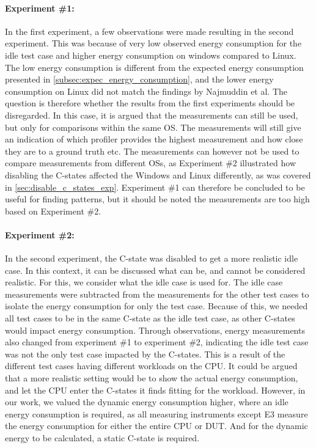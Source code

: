 \paragraph*{Experiment \#1:} In the first experiment, a few observations were made resulting in the second experiment. This was because of very low observed energy consumption for the idle test case and higher energy consumption on windows compared to Linux. The low energy consumption is different from the expected energy consumption presented in \cref{subsec:expec_energy_consumption}, and the lower energy consumption on Linux did not match the findings by Najmuddin et al.\cite[]{Najmuddin2021} The question is therefore whether the results from the first experiments should be disregarded. In this case, it is argued that the measurements can still be used, but only for comparisons within the same OS. The measurements will still give an indication of which profiler provides the highest measurement and how close they are to a ground truth etc. The measurements can however not be used to compare measurements from different OSs, as Experiment \#2 illustrated how disabling the C-states affected the Windows and Linux differently, as was covered in \cref{sec:disable_c_states_exp}. Experiment \#1 can therefore be concluded to be useful for finding patterns, but it should be noted the measurements are too high based on Experiment \#2.

\paragraph*{Experiment \#2:} In the second experiment, the C-state was disabled to get a more realistic idle case. In this context, it can be discussed what can be, and cannot be considered realistic. For this, we consider what the idle case is used for. The idle case measurements were subtracted from the measurements for the other test cases to isolate the energy consumption for only the test case. Because of this, we needed all test cases to be in the same C-state as the idle test case, as other C-states would impact energy consumption. Through observations, energy measurements also changed from experiment \#1 to experiment \#2, indicating the idle test case was not the only test case impacted by the C-states. This is a result of the different test cases having different workloads on the CPU. It could be argued that a more realistic setting would be to show the actual energy consumption, and let the CPU enter the C-states it finds fitting for the workload. However, in our work, we valued the dynamic energy consumption higher, where an idle energy consumption is required, as all measuring instruments except E3 measure the energy consumption for either the entire CPU or DUT. And for the dynamic energy to be calculated, a static C-state is required.

